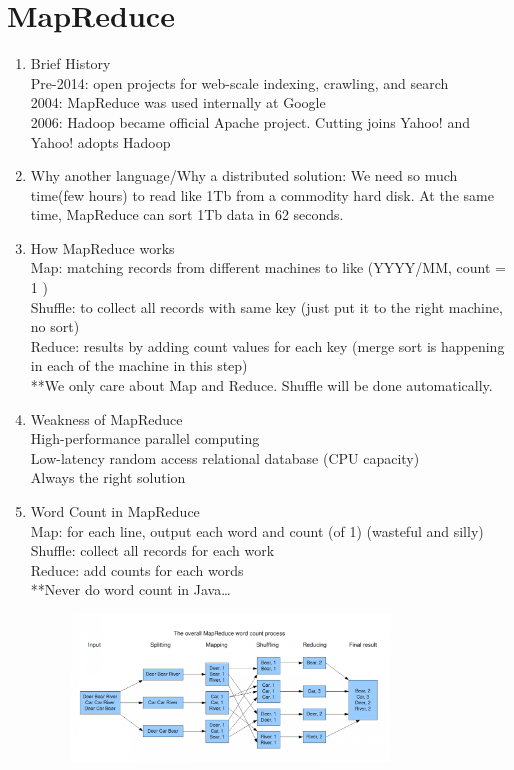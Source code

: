 \section{MapReduce}
\begin{enumerate}
  \item Brief History\\
  Pre-2014: open projects for web-scale indexing, crawling, and search\\
  2004: MapReduce was used internally at Google\\
  2006: Hadoop became official Apache project. Cutting joins Yahoo! and Yahoo! adopts Hadoop
  \item Why another language/Why a distributed solution: We need so much time(few hours) to read like 1Tb from a commodity hard disk. At the same time, MapReduce can sort 1Tb data in 62 seconds.
  \item How MapReduce works\\
  Map: matching records from different machines to like (YYYY/MM, count = 1 )\\
  Shuffle: to collect all records with same key (just put it to the right machine, no sort)\\
  Reduce: results by adding count values for each key (merge sort is happening in each of the machine in this step)\\
  **We only care about Map and Reduce. Shuffle will be done automatically.
  \item Weakness of MapReduce\\
  High-performance parallel computing\\
  Low-latency random access relational database (CPU capacity)\\
  Always the right solution
  \item Word Count in MapReduce\\
  Map: for each line, output each word and count (of 1) (wasteful and silly)\\
  Shuffle: collect all records for each work\\
  Reduce: add counts for each words\\
  **Never do word count in Java…
  \begin{figure}[ht]
    \begin{center}
      \includegraphics[width=0.8\textwidth]{figures/Wordcount.png}

\end{center}
\end{figure}
\end{enumerate}
